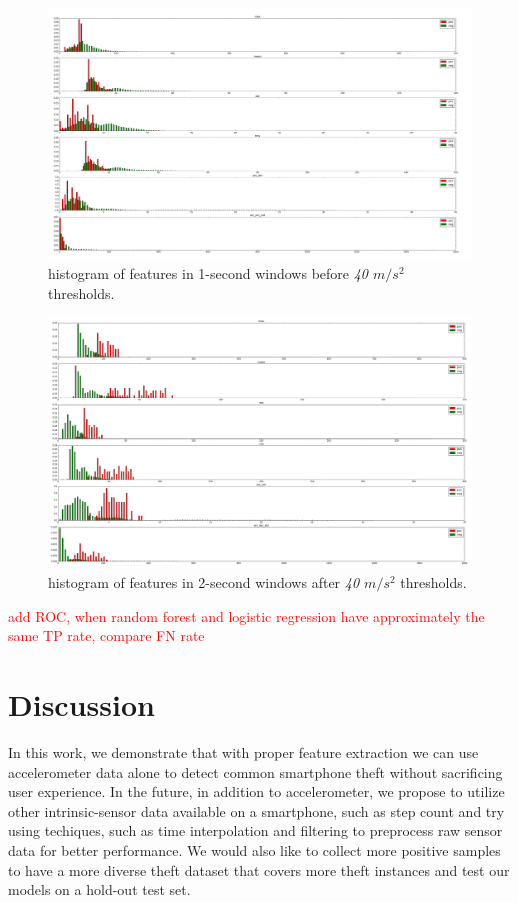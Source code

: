 \documentclass{soups}
\begin{document}
\begin{figure}
\begin{center}
\includegraphics[width=1.0\columnwidth]{hist_features_before_win_size_1_2.png}
\end{center}
\caption{histogram of features in 1-second windows before \textit{40 $m/s^2$} thresholds.}
\end{figure}
\begin{figure}
\begin{center}
\includegraphics[width=1.0\columnwidth]{hist_features_after_win_size_1_2.png}
\end{center}
\caption{histogram of features in 2-second windows after \textit{40 $m/s^2$} thresholds.}
\end{figure}



\textcolor{red}{add ROC, when random forest and logistic regression have approximately the same TP rate, compare FN rate}



\section{Discussion}
In this work, we demonstrate that with proper feature extraction we can use accelerometer data alone to detect common smartphone theft without sacrificing user experience. In the future, in addition to accelerometer, we propose to utilize other intrinsic-sensor data available on a smartphone, such as step count and try using techiques, such as time interpolation and filtering to preprocess raw sensor data for better performance. We would also like to collect more positive samples to have a more diverse theft dataset that covers more theft instances and test our models on a hold-out test set. 
\end{document}
